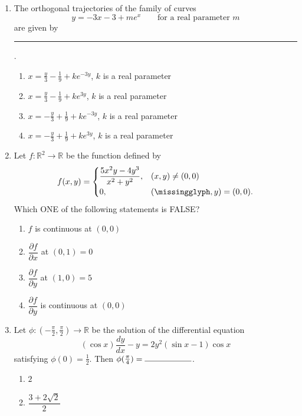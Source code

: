 \begin{enumerate}
\[f(x,y)=(x^2-1)^2+(y^2-1)^2\quad\text{for all }(x,y)\in\mathbb R^2.\]
Which ONE of the following statements is TRUE?
\begin{enumerate}[label=(\Alph*)]
\item $f$ has local maxima at exactly two points.
\item $f$ has local minima at exactly two points.
\item $f$ has local minima at exactly three points.
\item $f$ has exactly four saddle points.
\end{enumerate}
\item The orthogonal trajectories of the family of curves
\[y=-3x-3+me^x\qquad\text{for a real parameter }m\]
are given by \rule{2cm}{0.4pt}.
\begin{enumerate}[label=(\Alph*)]
\item $x=\frac y3-\frac19+ke^{-3y}$, $k$ is a real parameter
\item $x=\frac y3-\frac19+ke^{3y}$, $k$ is a real parameter
\item $x=-\frac y3+\frac19+ke^{-3y}$, $k$ is a real parameter
\item $x=-\frac y3+\frac19+ke^{3y}$, $k$ is a real parameter
\end{enumerate}
\item Let $f:\mathbb R^2\to\mathbb R$ be the function defined by
\[f(x,y)=\begin{cases}\dfrac{5x^2y-4y^3}{x^2+y^2},&(x,y)\ne(0,0)\\0,&(\missingglyph,y)=(0,0).\end{cases}\]
Which ONE of the following statements is FALSE?
\begin{enumerate}[label=(\Alph*)]
\item $f$ is continuous at $(0,0)$
\item $\dfrac{\partial f}{\partial x}$ at $(0,1)=0$
\item $\dfrac{\partial f}{\partial y}$ at $(1,0)=5$
\item $\dfrac{\partial f}{\partial y}$ is continuous at $(0,0)$
\end{enumerate}
\item Let $\phi:(-\frac\pi2,\frac\pi2)\to\mathbb R$ be the solution of the differential equation
\[(\cos x)\frac{dy}{dx}-y=2y^2(\sin x-1)\cos x\]
satisfying $\phi(0)=\frac12$. Then $\phi(\frac\pi4)=\rule{2cm}{0.4pt}$.
\begin{enumerate}[label=(\Alph*)]
\item $2$
\item $\dfrac{3+2\sqrt2}{2}$

\end{enumerate}
\end{enumerate}
